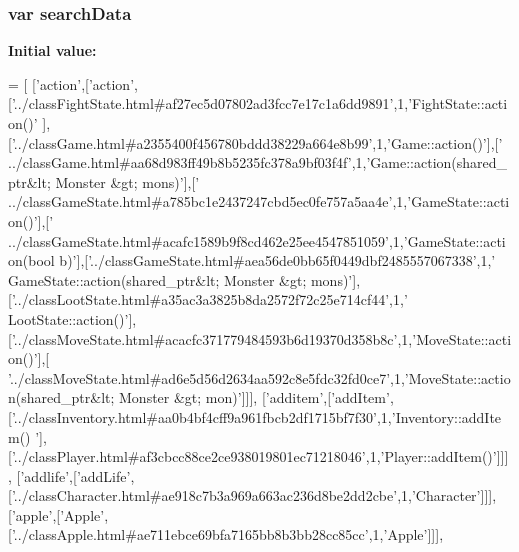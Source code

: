 \subsubsection[{search\-Data}]{\setlength{\rightskip}{0pt plus 5cm}var search\-Data}\label{functions__0_8js_ad01a7523f103d6242ef9b0451861231e}
{\bfseries Initial value\-:}
\begin{DoxyCode}
=
[
  [\textcolor{stringliteral}{'action'},[\textcolor{stringliteral}{'action'},[\textcolor{stringliteral}{'../classFightState.html#af27ec5d07802ad3fcc7e17c1a6dd9891'},1,\textcolor{stringliteral}{'FightState::action()'}
      ],[\textcolor{stringliteral}{'../classGame.html#a2355400f456780bddd38229a664e8b99'},1,\textcolor{stringliteral}{'Game::action()'}],[\textcolor{stringliteral}{'
      ../classGame.html#aa68d983ff49b8b5235fc378a9bf03f4f'},1,\textcolor{stringliteral}{'Game::action(shared\_ptr&lt; Monster &gt; mons)'}],[\textcolor{stringliteral}{'
      ../classGameState.html#a785bc1e2437247cbd5ec0fe757a5aa4e'},1,\textcolor{stringliteral}{'GameState::action()'}],[\textcolor{stringliteral}{'
      ../classGameState.html#acafc1589b9f8cd462e25ee4547851059'},1,\textcolor{stringliteral}{'GameState::action(bool b)'}],[\textcolor{stringliteral}{'../classGameState.html#aea56de0bb65f0449dbf2485557067338'},1,\textcolor{stringliteral}{'
      GameState::action(shared\_ptr&lt; Monster &gt; mons)'}],[\textcolor{stringliteral}{'../classLootState.html#a35ac3a3825b8da2572f72c25e714cf44'},1,\textcolor{stringliteral}{'
      LootState::action()'}],[\textcolor{stringliteral}{'../classMoveState.html#acacfc371779484593b6d19370d358b8c'},1,\textcolor{stringliteral}{'MoveState::action()'}],[\textcolor{stringliteral}{
      '../classMoveState.html#ad6e5d56d2634aa592c8e5fdc32fd0ce7'},1,\textcolor{stringliteral}{'MoveState::action(shared\_ptr&lt; Monster &gt;
       mon)'}]]],
  [\textcolor{stringliteral}{'additem'},[\textcolor{stringliteral}{'addItem'},[\textcolor{stringliteral}{'../classInventory.html#aa0b4bf4cff9a961fbcb2df1715bf7f30'},1,\textcolor{stringliteral}{'Inventory::addItem()
      '}],[\textcolor{stringliteral}{'../classPlayer.html#af3cbcc88ce2ce938019801ec71218046'},1,\textcolor{stringliteral}{'Player::addItem()'}]]],
  [\textcolor{stringliteral}{'addlife'},[\textcolor{stringliteral}{'addLife'},[\textcolor{stringliteral}{'../classCharacter.html#ae918c7b3a969a663ac236d8be2dd2cbe'},1,\textcolor{stringliteral}{'Character'}]]],
  [\textcolor{stringliteral}{'apple'},[\textcolor{stringliteral}{'Apple'},[\textcolor{stringliteral}{'../classApple.html#ae711ebce69bfa7165bb8b3bb28cc85cc'},1,\textcolor{stringliteral}{'Apple'}]]],

\end{DoxyCode}
